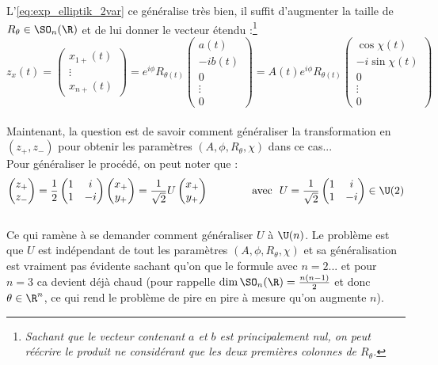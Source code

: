 L'\cref{eq:exp_elliptik_2var} ce généralise  très bien, il suffit d'augmenter la taille de $R_\theta\in\SO_n(\R)$ et de lui donner le vecteur étendu :\footnote{\textit{Sachant que le vecteur contenant $a$ et $b$ est principalement nul, on peut réécrire le produit ne considérant que les deux premières colonnes de $R_\theta$.}}
\[z_x(t) = \begin{pmatrix}x_{1+}(t) \\ \vdots \\ 
	x_{n+}(t)\end{pmatrix} = e^{i\phi} R_{\theta(t)}\begin{pmatrix} a(t) \\ -ib(t) \\ 0 \\ \vdots \\ 0 \end{pmatrix} = A(t)e^{i\phi} R_{\theta(t)} \begin{pmatrix} \cos\chi(t) \\ -i\sin\chi(t) \\ 0 \\ \vdots \\ 0 \end{pmatrix}\]
\\

Maintenant, la question est de savoir comment généraliser la transformation en $(z_+, z_-)$ pour obtenir les paramètres $(A, \phi, R_\theta, \chi)$ dans ce cas...
\\
Pour généraliser le procédé, on peut noter que :
\[\begin{pmatrix}z_+ \\ z_-\end{pmatrix} = \frac{1}{2}\begin{pmatrix}1 & i \\ 1 & -i\end{pmatrix} \begin{pmatrix}x_+ \\ y_+\end{pmatrix} = \frac{1}{\sqrt{2}}U \begin{pmatrix}x_+ \\ y_+\end{pmatrix}\qquad\qquad \text{avec }\ U=\frac{1}{\sqrt{2}}\begin{pmatrix}1 & i \\ 1 & -i\end{pmatrix}\in\U(2)\]
\\ 
Ce qui ramène à se demander comment généraliser $U$ à $\U(n)$. Le problème est que $U$ est indépendant de tout les paramètres $(A, \phi, R_\theta, \chi)$ et sa généralisation est vraiment pas évidente sachant qu'on que le formule avec $n=2$... et pour $n=3$ ca devient déjà chaud (pour rappelle $\dim \SO_n(\R)=\frac{n(n-1)}{2}$ et donc $\theta\in\R^n$, ce qui rend le problème de pire en pire à mesure qu'on augmente $n$).




